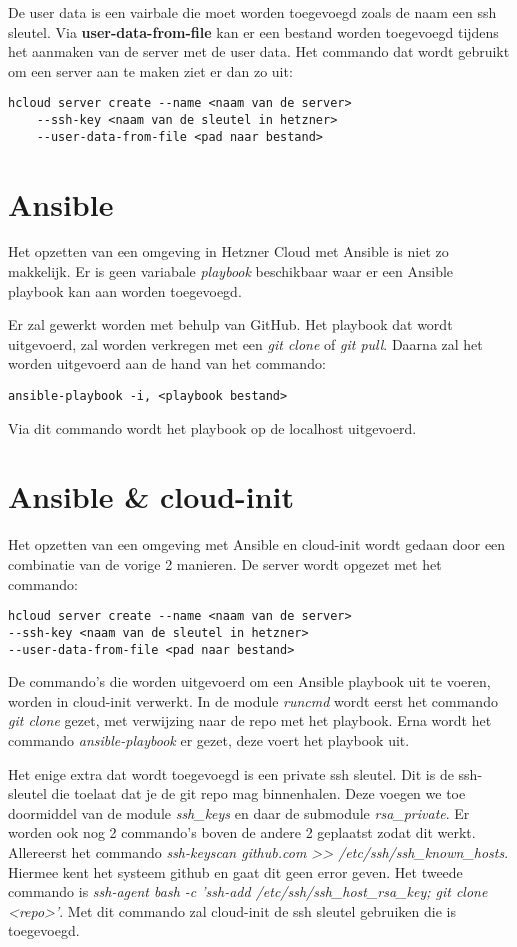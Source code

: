 De user data is een vairbale die moet worden toegevoegd zoals de naam een ssh sleutel. Via \textbf{user-data-from-file} kan er een bestand worden toegevoegd tijdens het aanmaken van de server met de user data. Het commando dat wordt gebruikt om een server aan te maken ziet er dan zo uit:
\begin{lstlisting}[basicstyle=\small]
hcloud server create --name <naam van de server> 
    --ssh-key <naam van de sleutel in hetzner>
    --user-data-from-file <pad naar bestand>
\end{lstlisting}

\section{Ansible}
Het opzetten van een omgeving in Hetzner Cloud met Ansible is niet zo makkelijk. Er is geen variabale \textit{playbook} beschikbaar waar er een Ansible playbook kan aan worden toegevoegd.

Er zal gewerkt worden met behulp van GitHub. Het playbook dat wordt uitgevoerd, zal worden verkregen met een \textit{git clone} of \textit{git pull}. Daarna zal het worden uitgevoerd aan de hand van het commando:
\begin{lstlisting}[basicstyle=\small]
ansible-playbook -i, <playbook bestand>
\end{lstlisting}
Via dit commando wordt het playbook op de localhost uitgevoerd. 



\newpage
\section{Ansible \& cloud-init}
Het opzetten van een omgeving met Ansible en cloud-init wordt gedaan door een combinatie van de vorige 2 manieren. De server wordt opgezet met het commando:
\begin{lstlisting}[basicstyle=\small]
hcloud server create --name <naam van de server> 
--ssh-key <naam van de sleutel in hetzner>
--user-data-from-file <pad naar bestand>
\end{lstlisting}
De commando's die worden uitgevoerd om een Ansible playbook uit te voeren, worden in cloud-init verwerkt. In de module \textit{runcmd} wordt eerst het commando \textit{git clone} gezet, met verwijzing naar de repo met het playbook. Erna wordt het commando \textit{ansible-playbook} er gezet, deze voert het playbook uit.

Het enige extra dat wordt toegevoegd is een private ssh sleutel. Dit is de ssh-sleutel die toelaat dat je de git repo mag binnenhalen. Deze voegen we toe doormiddel van de module \textit{ssh\_keys} en daar de submodule \textit{rsa\_private}. Er worden ook nog 2 commando's boven de andere 2 geplaatst zodat dit werkt. Allereerst het commando \textit{ssh-keyscan github.com >> /etc/ssh/ssh\_known\_hosts}. Hiermee kent het systeem github en gaat dit geen error geven. Het tweede commando is \textit{ssh-agent bash -c 'ssh-add /etc/ssh/ssh\_host\_rsa\_key; git clone <repo>'}. Met dit commando zal cloud-init de ssh sleutel gebruiken die is toegevoegd.

